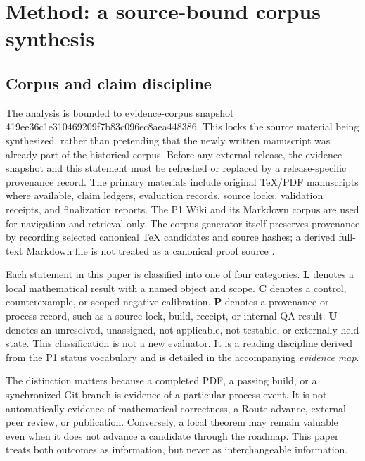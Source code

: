 \hypertarget{method-a-source-bound-corpus-synthesis}{%
\section{Method: a source-bound corpus synthesis}\label{method-a-source-bound-corpus-synthesis}}

\hypertarget{corpus-and-claim-discipline}{%
\subsection{Corpus and claim discipline}\label{corpus-and-claim-discipline}}

The analysis is bounded to evidence-corpus snapshot 419ee36c1e310469209f7b83c096ec8aea448386. This locks the source material being synthesized, rather than pretending that the newly written manuscript was already part of the historical corpus. Before any external release, the evidence snapshot and this statement must be refreshed or replaced by a release-specific provenance record. The primary materials include original TeX/PDF manuscripts where available, claim ledgers, evaluation records, source locks, validation receipts, and finalization reports. The P1 Wiki and its Markdown corpus are used for navigation and retrieval only. The corpus generator itself preserves provenance by recording selected canonical TeX candidates and source hashes; a derived full-text Markdown file is not treated as a canonical proof source .

Each statement in this paper is classified into one of four categories. \textbf{L} denotes a local mathematical result with a named object and scope. \textbf{C} denotes a control, counterexample, or scoped negative calibration. \textbf{P} denotes a provenance or process record, such as a source lock, build, receipt, or internal QA result. \textbf{U} denotes an unresolved, unassigned, not-applicable, not-testable, or externally held state. This classification is not a new evaluator. It is a reading discipline derived from the P1 status vocabulary  and is detailed in the accompanying \textit{evidence map}.

The distinction matters because a completed PDF, a passing build, or a synchronized Git branch is evidence of a particular process event. It is not automatically evidence of mathematical correctness, a Route advance, external peer review, or publication. Conversely, a local theorem may remain valuable even when it does not advance a candidate through the roadmap. This paper treats both outcomes as information, but never as interchangeable information.

